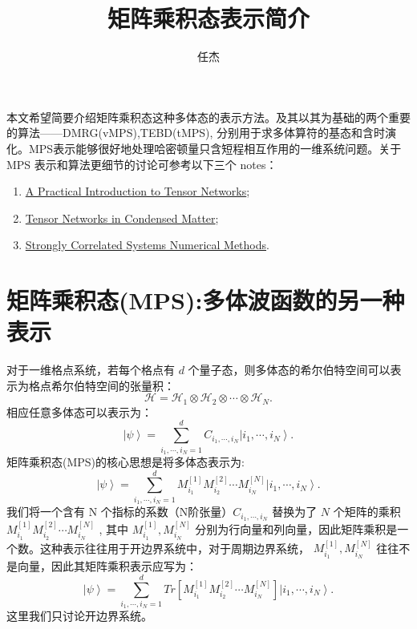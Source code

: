 \documentclass[UTF8]{ctexart}
\begin{document}
\title{矩阵乘积态表示简介}
\date{任杰}

\maketitle
\noindent 本文希望简要介绍矩阵乘积态这种多体态的表示方法。及其以其为基础的两个重要的算法——DMRG(vMPS),TEBD(tMPS), 分别用于求多体算符的基态和含时演化。MPS表示能够很好地处理哈密顿量只含短程相互作用的一维系统问题。关于 MPS 表示和算法更细节的讨论可参考以下三个 notes：
\begin{enumerate}
	\item \href{https://arxiv.org/abs/1306.2164}{A Practical Introduction to Tensor Networks};
	\item \href{https://www.researchgate.net/publication/271208696_Tensor_Networks_in_Condensed_Matter}{Tensor Networks in Condensed Matter};
	\item \href{https://link.springer.com/book/10.1007\%2F978-3-642-35106-8}{Strongly Correlated Systems Numerical Methods}.
\end{enumerate}
\section*{矩阵乘积态(MPS):多体波函数的另一种表示}
\noindent 对于一维格点系统，若每个格点有 $d$ 个量子态，则多体态的希尔伯特空间可以表示为格点希尔伯特空间的张量积：
\begin{equation}
	\mathscr{H}=\mathscr{H}_{1}\otimes\mathscr{H}_{2}\otimes\cdots\otimes\mathscr{H}_{N}.
\end{equation}
相应任意多体态可以表示为：
\begin{equation}
	\left|\psi\right\rangle =\sum_{i_{1},\cdots,i_{N}=1}^{d}C_{i_{1},\cdots,i_{N}}\left|i_{1},\cdots,i_{N}\right\rangle.
\end{equation}
矩阵乘积态(MPS)的核心思想是将多体态表示为:
\begin{equation}
	\left|\psi\right\rangle =\sum_{i_{1},\cdots,i_{N}=1}^{d}M_{i_{1}}^{\left[1\right]}M_{i_{2}}^{\left[2\right]}\cdots M_{i_{N}}^{\left[N\right]}\left|i_{1},\cdots,i_{N}\right\rangle.
\end{equation}
我们将一个含有 N 个指标的系数（N阶张量）$C_{i_{1},\cdots,i_{N}}$ 替换为了 $N$ 个矩阵的乘积  $M_{i_{1}}^{\left[1\right]}M_{i_{2}}^{\left[2\right]}\cdots M_{i_{N}}^{\left[N\right]}$ , 其中 $M_{i_{1}}^{\left[1\right]},M_{i_{N}}^{\left[N\right]}$ 分别为行向量和列向量，因此矩阵乘积是一个数。这种表示往往用于开边界系统中，对于周期边界系统， $M_{i_{1}}^{\left[1\right]},M_{i_{N}}^{\left[N\right]}$ 往往不是向量，因此其矩阵乘积表示应写为：
\begin{equation}
	\left|\psi\right\rangle =\sum_{i_{1},\cdots,i_{N}=1}^{d}Tr\left[M_{i_{1}}^{\left[1\right]}M_{i_{2}}^{\left[2\right]}\cdots M_{i_{N}}^{\left[N\right]}\right]\left|i_{1},\cdots,i_{N}\right\rangle.
\end{equation}
这里我们只讨论开边界系统。
\end{document}
